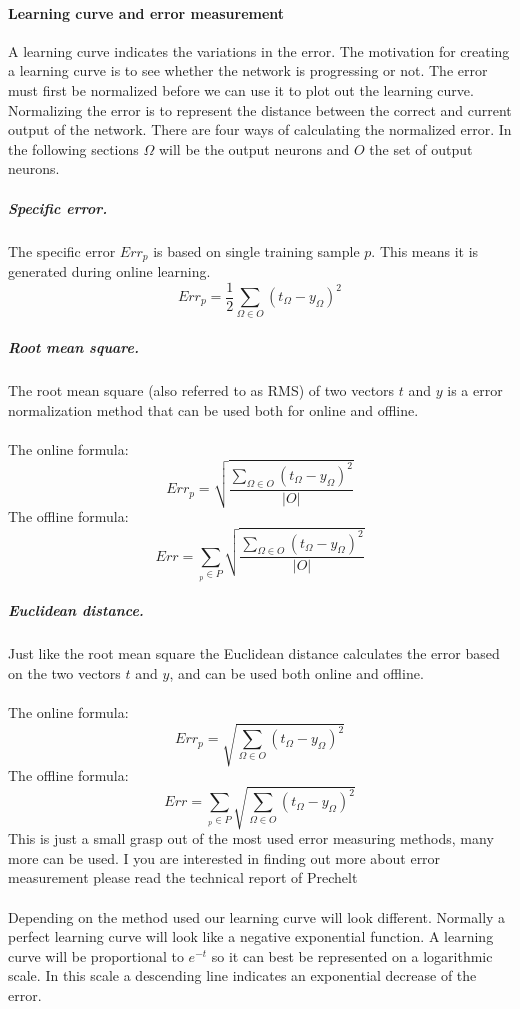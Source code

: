 \documentclass[pdftex,a4paper,12pt,twoside]{report}
\theoremstyle{plain} \newtheorem{theorem}{Theorem} \newtheorem{proposition}{Proposition} \newtheorem{lemma}{Lemma} \newtheorem*{corollary}{Corollary}
\theoremstyle{definition} \newtheorem{definition}{Definition} \newtheorem{conjecture}{Conjecture} \newtheorem*{example}{Example} \newtheorem{algorithm}{Algorithm}
\theoremstyle{remark} \newtheorem*{remark}{Remark} \newtheorem*{note}{Note} \newtheorem{case}{Case}
\begin{document}
\paragraph{Learning curve and error measurement}
A learning curve indicates the variations in the error. The motivation for creating a learning curve is to see whether the network is progressing or not. The error must first be normalized before we can use it to plot out the learning curve. Normalizing the error is to represent the distance between the correct and current output of the network. There are four ways of calculating the normalized error. In the following sections $\Omega$ will be the output neurons and $O$ the set of output neurons.
\subparagraph{Specific error.}
The specific error $Err_p$ is based on single training sample $p$. This means it is generated during online learning.
\begin{equation}
Err_p = \frac{1}{2} \sum_{\Omega \in O}(t_\Omega - y_\Omega)^2
\end{equation}
\subparagraph{Root mean square.}
The root mean square (also referred to as RMS) of two vectors $t$ and $y$ is a error normalization method that can be used both for online and offline.\\\\
The online formula:
\begin{equation}
Err_p =  \sqrt{\frac{\sum_{\Omega \in O}(t_\Omega - y_\Omega)^2}{|O|}}
\end{equation}
The offline formula:
\begin{equation}
Err = \sum_{_{p} \in P}\sqrt{\frac{\sum_{\Omega \in O}(t_\Omega - y_\Omega)^2}{|O|}}
\end{equation}
\subparagraph{Euclidean distance.}
Just like the root mean square the Euclidean distance calculates the error based on the two vectors $t$ and $y$, and can be used both online and offline.\\\\
The online formula:
\begin{equation}
Err_p =  \sqrt{{\sum_{\Omega \in O}(t_\Omega - y_\Omega)^2}}
\end{equation}
The offline formula:
\begin{equation}
Err = \sum_{_{p} \in P}\sqrt{{\sum_{\Omega \in O}(t_\Omega - y_\Omega)^2}}
\end{equation}
This is just a small grasp out of the most used error measuring methods, many more can be used. I you are interested in finding out more about error measurement please read the technical report of Prechelt \citep{Prechelt1994}\\\\Depending on the method used our learning curve will look different. Normally a perfect learning curve will look like a negative exponential function. A learning curve will be proportional to $e^{-t}$ so it can best be represented on a logarithmic scale. In this scale a descending line indicates an exponential decrease of the error.
\end{document}
